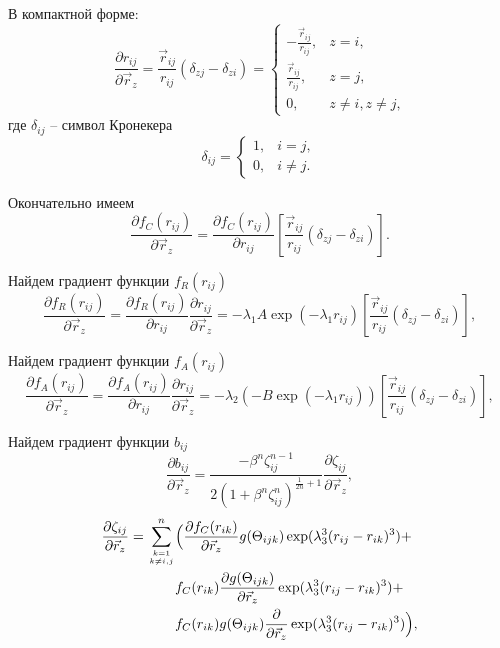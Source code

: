 В компактной форме:
\[
\frac{\partial r_{ij}}{\partial \vec{r}_z} = \frac{\vec {r}_{ij}}{r_{ij}}\left(\delta_{zj} - \delta_{zi}\right) = 
\begin{cases}
-\frac{\vec {r}_{ij}}{r_{ij}}, &\text{$z = i$,}\\
\frac{\vec {r}_{ij}}{r_{ij}}, &\text{$z = j$,}\\
0, &\text{$z \neq i, z \neq j$,}
\end{cases}
\]
где $\delta_{ij}$ -- символ Кронекера
\begin{equation}
\delta_{ij} = \left\{\begin{matrix} 
1, &  i=j,  \\ 
0, &  i \ne j. \end{matrix}\right.
\end{equation}

Окончательно имеем 
\begin{equation}
\frac{\partial f_C(r_{ij})}{\partial \vec{r}_z} =  \frac{\partial f_C(r_{ij})}{\partial r_{ij}} \left[ \frac{\vec {r}_{ij}}{r_{ij}}\left(\delta_{zj} - \delta_{zi}\right)\right].
\end{equation}

Найдем  градиент функции $f_R(r_{ij})$
\begin{equation}
\frac{\partial f_R(r_{ij})}{\partial \vec{r}_z} = \frac{\partial f_R(r_{ij})}{\partial r_{ij}} \frac{\partial r_{ij}}{\partial \vec{r}_z} =  -\lambda_1 A \exp(-\lambda_1  r_{ij}) \left[ \frac{\vec {r}_{ij}}{r_{ij}}\left(\delta_{zj} - \delta_{zi}\right)\right],
\end{equation}

Найдем  градиент функции $f_A(r_{ij})$
\begin{equation}
\frac{\partial f_A(r_{ij})}{\partial \vec{r}_z} = \frac{\partial f_A(r_{ij})}{\partial r_{ij}} \frac{\partial r_{ij}}{\partial \vec{r}_z} =  -\lambda_2 (-B \exp(-\lambda_1  r_{ij})) \left[ \frac{\vec {r}_{ij}}{r_{ij}}\left(\delta_{zj} - \delta_{zi}\right)\right],
\end{equation}

Найдем градиент функции $b_{ij}$
\begin{equation}
\frac{\partial b_{ij}}{\partial \vec{r}_z} = \frac{- \beta^n \zeta^{n-1}_{ij}}{2(1 + \beta^n \zeta^n_{ij})^{\frac{1}{2n} + 1}} \frac{\partial \zeta_{ij}}{\partial \vec{r}_z},
\end{equation}
\begin{align*}
\frac{\partial \zeta_{ij}}{\partial \vec{r}_z} = \displaystyle\sum_{k=1 \atop k \neq i, j}^{n} & \Big( \frac{\partial f_C(r_{ik})}{\partial \vec{r}_z} g(\Theta_{ijk}) \exp(\lambda^3_3(r_{ij} - r_{ik})^3) + \\
                                                                          &    f_C(r_{ik}) \frac{\partial g(\Theta_{ijk})}{\partial \vec{r}_z} \exp(\lambda^3_3(r_{ij} - r_{ik})^3) +\\ 
                                                                          &    f_C(r_{ik}) g(\Theta_{ijk}) \frac{\partial}{\partial \vec{r}_z}\exp(\lambda^3_3(r_{ij} - r_{ik})^3) \Big),
\end{align*}

